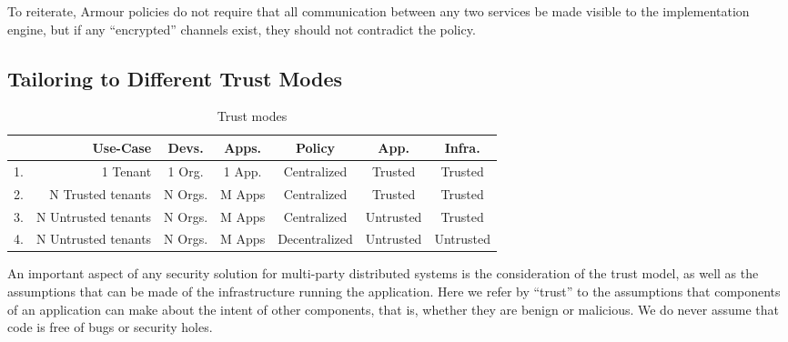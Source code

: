 \documentclass[a4paper]{article}
\newcommand{\gp}[1]{\gpnote{#1}}
\newcommand{\armour}{{\sc Armour}}
\begin{document}
To reiterate, \armour{} policies do not require that all communication
between any two services be made visible to the implementation
engine, but if any ``encrypted'' channels exist, they should not
contradict the policy.


\subsection{Tailoring to Different Trust Modes}
\label{sec:attack-surface}

\begin{table}[t]
  \centering
  \small
    \begin{tabular}[t]{| c | r | c | c | c | c | c |}
      \hline
         & Use-Case            & Devs.   & Apps.  & Policy        & App.      & Infra.    \\
      \hline
      1. & 1 Tenant            & 1 Org.  & 1 App. & Centralized   & Trusted   & Trusted   \\
      2. & N Trusted tenants   & N Orgs. & M Apps & Centralized   & Trusted   & Trusted   \\
      3. & N Untrusted tenants & N Orgs. & M Apps & Centralized   & Untrusted & Trusted   \\
      4. & N Untrusted tenants & N Orgs. & M Apps & Decentralized & Untrusted & Untrusted \\
      \hline
    \end{tabular}
    \caption{Trust modes}
    \label{tab:attacker}
  \end{table}



    


An important aspect of any security solution for multi-party
distributed systems is the consideration of the trust model, as well
as the assumptions that can be made of the infrastructure running the
application.
%
Here we refer by ``trust'' to the assumptions that components of an
application can make about the intent of other components, that is,
whether they are benign or malicious.
%
We do never assume that code is free of bugs or security holes. 
%
\end{document}
